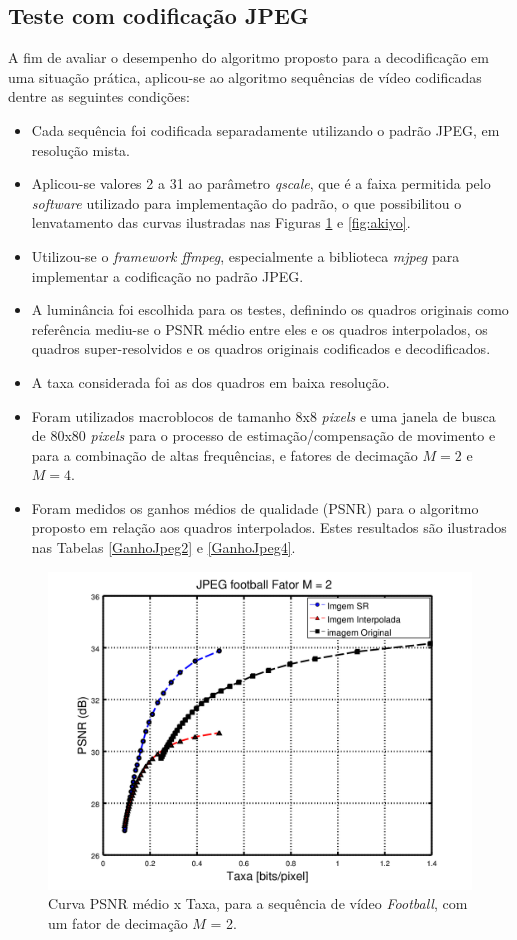 \subsection{Teste com codificação JPEG}
A fim de avaliar o desempenho do algoritmo proposto para a decodificação em uma situação prática, aplicou-se ao algoritmo sequências de vídeo codificadas dentre as seguintes condições:
\begin{itemize}
\item Cada sequência foi codificada separadamente utilizando o padrão JPEG, em resolução mista.
\item Aplicou-se valores 2 a 31 ao parâmetro  \textit{qscale}, que é a faixa permitida pelo \textit{software} utilizado para implementação do padrão, o que possibilitou o lenvatamento das curvas ilustradas nas Figuras \ref{fig:football} e \ref{fig:akiyo}.
\item Utilizou-se o \textit{framework ffmpeg}, especialmente a biblioteca \textit{mjpeg}
para implementar a codificação no padrão JPEG.
\item A luminância foi escolhida para os testes, definindo os quadros originais como referência mediu-se o PSNR médio entre eles e os quadros interpolados, os quadros super-resolvidos e os quadros originais codificados e decodificados.
\item A taxa considerada foi as dos quadros em baixa resolução.
\item Foram utilizados macroblocos de tamanho 8x8 \textit{pixels} e uma janela de busca de 80x80 \textit{pixels} para o processo de estimação/compensação de movimento e para a combinação de altas frequências, e fatores de decimação $M=2$ e $M=4$.
\item Foram medidos os ganhos médios \cite{bjontegaard2001calcuation} de qualidade (PSNR) para o algoritmo proposto em relação aos quadros interpolados. Estes resultados são ilustrados nas Tabelas \ref{GanhoJpeg2} e \ref{GanhoJpeg4}.

\end{itemize}
\begin{figure}[H]
	\centering
	\includegraphics[scale=0.5]{figuras/JPEG_football_Downsampling_factor_2.png}
	\caption{Curva PSNR médio x Taxa, para a sequência de vídeo \textit{Football}, com um fator de decimação $M$ = 2.}
	\label{fig:football}
\end{figure}


